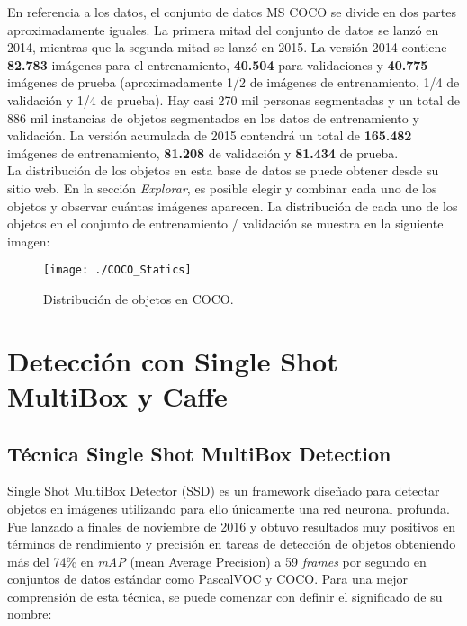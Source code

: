 \documentclass[a4paper, 12pt, oneside]{book}
\begin{document}
En referencia a los datos, el conjunto de datos MS COCO se divide en dos partes aproximadamente iguales. La primera mitad del conjunto de datos se lanzó en 2014, mientras que la segunda mitad se lanzó en 2015. La versión 2014 contiene \textbf{82.783} imágenes para el entrenamiento, \textbf{40.504} para validaciones y \textbf{40.775} imágenes de prueba (aproximadamente 1/2 de imágenes de entrenamiento, 1/4 de validación y 1/4 de prueba). Hay casi 270 mil personas segmentadas y un total de 886 mil instancias de objetos segmentados en los datos de entrenamiento y validación. La versión acumulada de 2015 contendrá un total de \textbf{165.482} imágenes de entrenamiento, \textbf{81.208} de validación y \textbf{81.434} de prueba.\\

La distribución de los objetos en esta base de datos se puede obtener desde su sitio web. En la sección \textit{Explorar}, es posible elegir y combinar cada uno de los objetos y observar cuántas imágenes aparecen. La distribución de cada uno de los objetos en el conjunto de entrenamiento / validación se muestra en la siguiente imagen:

\begin{figure}[H]
\begin{center}
\texttt{[image: ./COCO\_Statics]}
\caption{Distribución de objetos en COCO.}
\end{center}
\end{figure}

\chapter{Detección con Single Shot MultiBox y Caffe}

\section{Técnica Single Shot MultiBox Detection}

Single Shot MultiBox Detector (SSD) es un framework diseñado para detectar objetos en imágenes utilizando para ello únicamente una red neuronal profunda. Fue lanzado a finales de noviembre de 2016 y obtuvo resultados muy positivos en términos de rendimiento y precisión en tareas de detección de objetos obteniendo más del 74\% en \textit{mAP} (mean Average Precision) a 59 \textit{frames} por segundo en conjuntos de datos estándar como PascalVOC y COCO. Para una mejor comprensión de esta técnica, se puede comenzar con definir el significado de su nombre:
\end{document}
